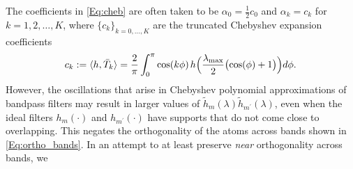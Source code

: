 \documentclass[journal, 10pt]{IEEEtran}
\begin{document}
The coefficients in \eqref{Eq:cheb} are often taken to be $\alpha_0=\frac{1}{2}c_0$ and $\alpha_k=c_k$ for $k=1,2,\ldots,K$, where  $\{c_k\}_{k=0,\ldots,K}$ are the truncated Chebyshev expansion coefficients 
\begin{align}\label{Eq:cheb_coeff}
\hspace{-.1in}c_{k}:=\langle h , \bar{T}_k \rangle = \frac{2}{\pi}\int_{0}^{\pi}\cos(k\phi)\hspace{.02in}h\Bigl(\frac{\lambda_{\max}}{2} \bigl(\cos(\phi) +1\bigr)\Bigr)d\phi.\hspace{-.08in}
\end{align}
However, the oscillations that arise in Chebyshev polynomial approximations of bandpass filters may result in larger values of $\tilde{h}_m(\lambda)\tilde{h}_{m^{\prime}}(\lambda)$, even when the ideal filters $h_m(\cdot)$ and $h_{m^{\prime}}(\cdot)$ have supports that do not come close to overlapping. This negates the orthogonality of the atoms across bands shown in \eqref{Eq:ortho_bands}. In an attempt to at least preserve \emph{near} orthogonality across bands, we 
\end{document}
